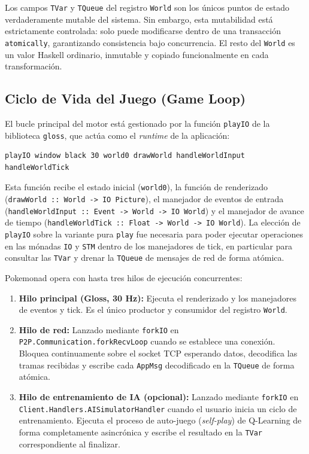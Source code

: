 \medskip

Los campos \texttt{TVar} y \texttt{TQueue} del registro \texttt{World} son los únicos puntos de estado verdaderamente mutable del sistema. Sin embargo, esta mutabilidad está estrictamente controlada: solo puede modificarse dentro de una transacción \texttt{atomically}, garantizando consistencia bajo concurrencia. El resto del \texttt{World} es un valor Haskell ordinario, inmutable y copiado funcionalmente en cada transformación.

\subsection{Ciclo de Vida del Juego (Game Loop)}

El bucle principal del motor está gestionado por la función \texttt{playIO} de la biblioteca \texttt{gloss}, que actúa como el \textit{runtime} de la aplicación:

\begin{verbatim}
playIO window black 30 world0 drawWorld handleWorldInput handleWorldTick
\end{verbatim}

Esta función recibe el estado inicial (\texttt{world0}), la función de renderizado (\texttt{drawWorld :: World -> IO Picture}), el manejador de eventos de entrada (\texttt{handleWorldInput :: Event -> World -> IO World}) y el manejador de avance de tiempo (\texttt{handleWorldTick :: Float -> World -> IO World}). La elección de \texttt{playIO} sobre la variante pura \texttt{play} fue necesaria para poder ejecutar operaciones en las mónadas \texttt{IO} y \texttt{STM} dentro de los manejadores de tick, en particular para consultar las \texttt{TVar} y drenar la \texttt{TQueue} de mensajes de red de forma atómica.

Pokemonad opera con hasta tres hilos de ejecución concurrentes:

\begin{enumerate}
    \item \textbf{Hilo principal (Gloss, 30 Hz):} Ejecuta el renderizado y los manejadores de eventos y tick. Es el único productor y consumidor del registro \texttt{World}.
    \item \textbf{Hilo de red:} Lanzado mediante \texttt{forkIO} en \texttt{P2P.Communication.forkRecvLoop} cuando se establece una conexión. Bloquea continuamente sobre el socket TCP esperando datos, decodifica las tramas recibidas y escribe cada \texttt{AppMsg} decodificado en la \texttt{TQueue} de forma atómica.
    \item \textbf{Hilo de entrenamiento de IA (opcional):} Lanzado mediante \texttt{forkIO} en \texttt{Client.Handlers.AISimulatorHandler} cuando el usuario inicia un ciclo de entrenamiento. Ejecuta el proceso de auto-juego (\textit{self-play}) de Q-Learning de forma completamente asincrónica y escribe el resultado en la \texttt{TVar} correspondiente al finalizar.
\end{enumerate}

